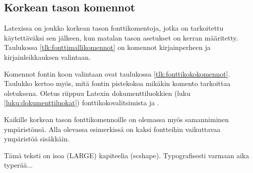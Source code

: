 \subsection{Korkean tason komennot}

Latexissa on joukko korkean tason fontti\-komentoja, jotka on
tarkoitettu käytettäväksi sen jälkeen, kun matalan tason asetukset on
kerran määritetty. Taulukossa \ref{tlk:fonttimallikomennot} on komennot
kirjainperheen ja kirjainleikkauksen valintaan.

Komennot fontin koon valintaan ovat taulukossa
\ref{tlk:fonttikokokomennot}. Taulukko kertoo myös, mitä
fontin pistekokoa mikäkin komento tarkoittaa oletuksena. Oletus riippuu
Latexin dokumenttiluokkien (luku \ref{luku:dokumenttiluokat})
fonttikokovalitsimista \koodi{10pt, 11pt} ja \koodi{12pt}.

Kaikille korkean tason fonttikomennoille on olemassa myös samanniminen
ympäristönsä. Alla olevassa esimerkissä on kaksi fontteihin vaikuttavaa
ympäristöä sisäkkäin.

\begin{koodilohkosis}
  \begin{LARGE}
    \begin{scshape}
      Tämä teksti on isoa (LARGE) kapiteelia (scshape).
      Typografisesti varmaan aika typerää...
    \end{scshape}
  \end{LARGE}
\end{koodilohkosis}

